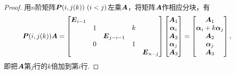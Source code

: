 \begin{property}
\begin{proof}
用\(n\)阶矩阵\(\boldsymbol{P}(i,j(k))\ (i < j)\)左乘\(\boldsymbol{A}\)，将矩阵\(\boldsymbol{A}\)作相应分块，有\[
	\boldsymbol{P}(i,j(k)) \boldsymbol{A} = \begin{bmatrix}
		\boldsymbol{E}_{i-1} \\
		& 1 & & k \\
		& & \boldsymbol{E}_{j-i-1} \\
		& 0 & & 1 \\
		& & & & \boldsymbol{E}_{n-j}
	\end{bmatrix}
	\begin{bmatrix}
		\boldsymbol{A}_1 \\ \boldsymbol\alpha_i \\ \boldsymbol{A}_2 \\ \boldsymbol\alpha_j \\ \boldsymbol{A}_3
	\end{bmatrix}
	= \begin{bmatrix}
		\boldsymbol{A}_1 \\ \boldsymbol\alpha_i + k \boldsymbol\alpha_j \\ \boldsymbol{A}_2 \\ \boldsymbol\alpha_j \\ \boldsymbol{A}_3
	\end{bmatrix},
\]
即把\(\boldsymbol{A}\)第\(j\)行的\(k\)倍加到第\(i\)行.
\end{proof}
\end{property}
